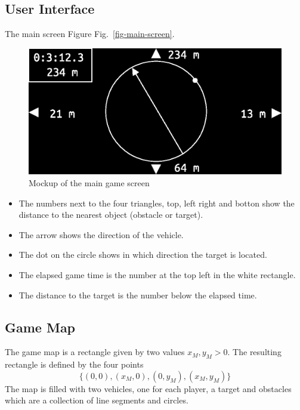 \documentclass[11pt]{article}
\newcommand{\figref}[1]{Fig.~\eqref{#1}}
\begin{document}
\subsection{User Interface}
\label{sec-user-interface}
The main screen Figure \figref{fig-main-screen}.
\begin{figure}
    \includegraphics[width=\textwidth]{screen.eps}
\caption{Mockup of the main game screen}\label{fig-main-screen}
\end{figure}
\begin{itemize}
    \item The numbers next to the four triangles, top, left right and botton
        show the distance to the nearest object (obstacle or target).
    \item The arrow shows the direction of the vehicle.
    \item The dot on the circle shows in which direction the target is
        located.
    \item The elapsed game time is the number at the top left in the white
        rectangle.
    \item The distance to the target is the number below the elapsed time.
\end{itemize}

\subsection{Game Map}
\label{sec-game-map}
The game map is a rectangle given by two values $x_M, y_M > 0$. The resulting
rectangle is defined by the four points
\begin{equation*}
    \{(0,0), (x_M, 0), (0, y_M), (x_M, y_M)\}
\end{equation*}
The map is filled with two vehicles, one for each player, a target and
obstacles which are a collection of line segments and circles.
\end{document}
